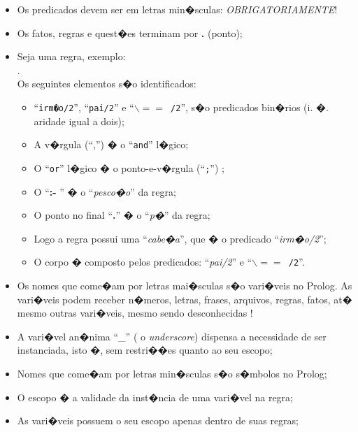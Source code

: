 \documentclass[final,a4paper]{article}
\begin{document}
\begin{itemize}
\item Os predicados devem ser em letras min�sculas: {\it OBRIGATORIAMENTE}!

\item Os fatos, regras e quest�es terminam por {\bf .}
(ponto);

\item Seja uma regra, exemplo:\\
 { }. \\
 Os seguintes elementos s�o identificados:
 \begin{itemize}
   \item ``\texttt{irm�o/2}'', ``\texttt{pai/2}'' e  ``\texttt{$\backslash==$ /2}'', s�o predicados bin�rios (i. �. aridade igual a dois);
 \item A v�rgula  (``,'')   � o ``\texttt{and}'' l�gico;
 \item O ``\texttt{or}'' l�gico � o ponto-e-v�rgula
(``\texttt{;}'') ;
 \item O   ``{\bf :- }'' � o ``{\em pesco�o}'' da regra;
 \item O ponto no final   ``{\bf .}'' � o ``{\em p�}'' da regra;
 \item Logo a regra possui uma  ``{\em cabe�a}'', que � o predicado ``{\em irm�o/2}'';
 \item O corpo � composto pelos predicados: ``{\em pai/2}'' e  ``\texttt{$\backslash==$ /2}''.
  \end{itemize}

\item Os nomes que come�am por letras mai�sculas s�o  vari�veis
 no Prolog. As vari�veis
   podem receber n�meros, letras, frases, arquivos, regras, fatos, at� mesmo outras vari�veis, mesmo sendo desconhecidas !

\item A vari�vel an�nima ``\_''  ( o {\em underscore}) 
dispensa a necessidade de ser instanciada, isto �, 
sem restri��es quanto ao seu escopo;

\item Nomes que come�am por letras min�sculas s�o
s�mbolos  no Prolog;

\item O escopo � a validade da inst�ncia de uma vari�vel na regra;

\item As vari�veis possuem o seu escopo apenas dentro de suas regras;

\end{itemize}
\end{document}
